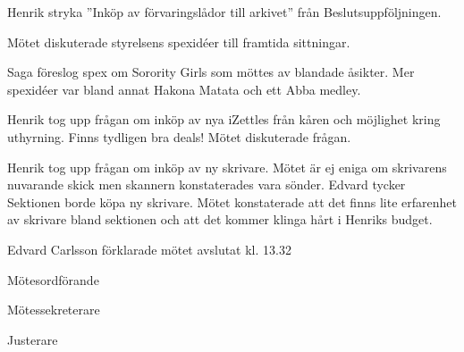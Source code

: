 \documentclass[10pt]{article}
\def\mo{Edvard Carlsson}
\def\ms{Mattias Lundström}
\def\ji{Jonathan Benitez}
\begin{document}
\begin{paragrafer}
\Mbaby

Henrik \ypa stryka ''Inköp av förvaringslådor till arkivet'' från Beslutsuppföljningen. 

\Mbaby

Mötet diskuterade styrelsens spexidéer till framtida sittningar. 

Saga föreslog spex om Sorority Girls som möttes av blandade åsikter. Mer spexidéer var bland annat Hakona Matata och ett Abba medley.  

Henrik tog upp frågan om inköp av nya iZettles från kåren och möjlighet kring uthyrning. Finns tydligen bra deals! Mötet diskuterade frågan. 

Henrik tog upp frågan om inköp av ny skrivare. Mötet är ej eniga om skrivarens nuvarande skick men skannern konstaterades vara sönder. Edvard tycker Sektionen borde köpa ny skrivare. Mötet konstaterade att det finns lite erfarenhet av skrivare bland sektionen och att det kommer klinga hårt i Henriks budget.


{\mo} förklarade mötet avslutat kl. 13.32 
\end{paragrafer}

\hidesignfoot
\begin{signatures}{3}
\signature{\mo}{Mötesordförande}
\signature{\ms}{Mötessekreterare}
\signature{\ji}{Justerare}
\end{signatures}
\end{document}

